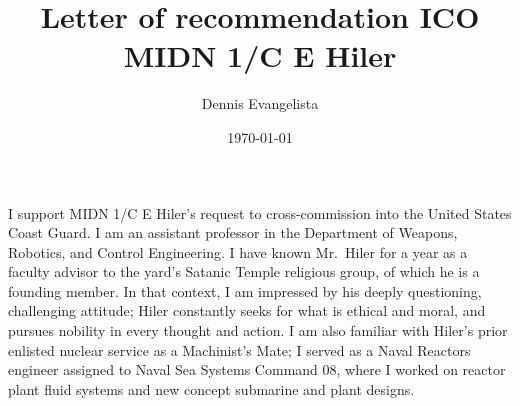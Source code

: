 \documentclass[10pt,courier]{navymemo}
\author{Dennis Evangelista}
\title{Letter of recommendation ICO MIDN 1/C E Hiler}
\date{\today}
\begin{document}
\makedateblock{}

\MEMORANDUM{}

\begin{navyletterheader}
\navyskip{}%
\navysubjline{}%
\end{navyletterheader}





\section{} 
I support MIDN 1/C E Hiler's request to cross-commission into the United States Coast Guard. I am an assistant professor in the Department of Weapons, Robotics, and Control Engineering. I have known Mr.~Hiler for a year as a faculty advisor to the yard's Satanic Temple religious group, of which he is a founding member. In that context, I am impressed by his deeply questioning, challenging attitude; Hiler constantly seeks for what is ethical and moral, and pursues nobility in every thought and action. I am also familiar with Hiler's prior enlisted nuclear service as a Machinist's Mate; I served as a Naval Reactors engineer assigned to Naval Sea Systems Command 08, where I worked on reactor plant fluid systems and new concept submarine and plant designs. 
\end{document}
